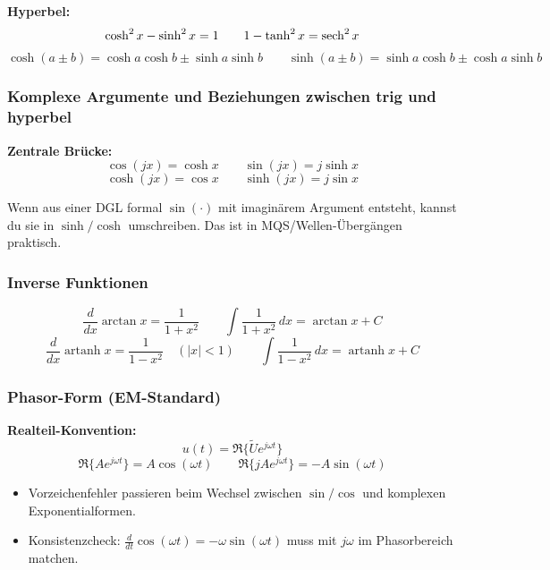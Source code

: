 \documentclass[a4paper]{article}
\newcommand{\imp}[1]{{\color{accent}\bfseries #1}}
\begin{document}
\begin{schema}
\imp{Hyperbel:}
\[
\cosh^2 x-\sinh^2 x = 1
\qquad
1-\tanh^2 x = \sech^2 x
\]
\[
\cosh(a\pm b)=\cosh a\cosh b \pm \sinh a\sinh b
\qquad
\sinh(a\pm b)=\sinh a\cosh b \pm \cosh a\sinh b
\]
\end{schema}

\subsubsection{Komplexe Argumente und Beziehungen zwischen trig und hyperbel}
\begin{schema}
\imp{Zentrale Brücke:}
\[
\cos(jx)=\cosh x
\qquad
\sin(jx)=j\sinh x
\]
\[
\cosh(jx)=\cos x
\qquad
\sinh(jx)=j\sin x
\]
\end{schema}

\begin{merke}
Wenn aus einer DGL formal \(\sin(\cdot)\) mit imaginärem Argument entsteht, kannst du sie in \(\sinh/\cosh\) umschreiben.
Das ist in MQS/Wellen-Übergängen praktisch.
\end{merke}

\subsubsection{Inverse Funktionen }
\begin{schema}
\[
\frac{d}{dx}\arctan x = \frac{1}{1+x^2}
\qquad
\int \frac{1}{1+x^2}\,dx = \arctan x + C
\]
\[
\frac{d}{dx}\operatorname{artanh} x = \frac{1}{1-x^2}\quad (|x|<1)
\qquad
\int \frac{1}{1-x^2}\,dx = \operatorname{artanh} x + C
\]
\end{schema}

\subsubsection{Phasor-Form (EM-Standard)}
\begin{schema}
\imp{Realteil-Konvention:}
\[
u(t)=\Re\{\tilde{U}e^{j\omega t}\}
\]
\[
\Re\{Ae^{j\omega t}\}=A\cos(\omega t)
\qquad
\Re\{jAe^{j\omega t}\}=-A\sin(\omega t)
\]
\end{schema}


\begin{checkitem}
\begin{itemize}
  \item Vorzeichenfehler passieren beim Wechsel zwischen \(\sin/\cos\) und komplexen Exponentialformen.
  \item Konsistenzcheck: \(\frac{d}{dt}\cos(\omega t)=-\omega\sin(\omega t)\) muss mit \(j\omega\) im Phasorbereich matchen.
\end{itemize}
\end{checkitem}
\end{document}
